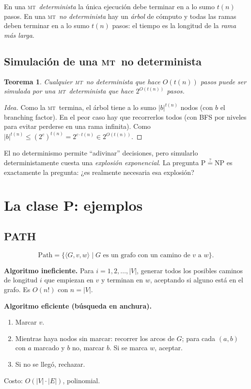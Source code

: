 \documentclass[11pt,a4paper]{article}
\theoremstyle{definicion}
\newtheorem{teorema}[definicion]{Teorema}
\newcommand{\MT}{\textsc{mt}}
\newcommand{\enc}[1]{\langle #1 \rangle}
\newcommand{\NP}{\mathrm{NP}}
\newcommand{\Pclass}{\mathrm{P}}
\begin{document}
En una \MT\ \emph{determinista} la \'unica ejecuci\'on debe terminar en a lo sumo $t(n)$ pasos. En una \MT\ \emph{no determinista} hay un \emph{\'arbol} de c\'omputo y todas las ramas deben terminar en a lo sumo $t(n)$ pasos: el tiempo es la longitud de la \emph{rama m\'as larga}.

\subsection{Simulaci\'on de una \MT\ no determinista}

\begin{teorema}
Cualquier \MT\ no determinista que hace $O(t(n))$ pasos puede ser simulada por una \MT\ determinista que hace $2^{O(t(n))}$ pasos.
\end{teorema}

\begin{proof}[Idea]
Como la \MT\ termina, el \'arbol tiene a lo sumo $|b|^{t(n)}$ nodos (con $b$ el branching factor). En el peor caso hay que recorrerlos todos (con BFS por niveles para evitar perderse en una rama infinita). Como $|b|^{t(n)} \leq (2^c)^{t(n)} = 2^{c \cdot t(n)} \in 2^{O(t(n))}$.
\end{proof}

\begin{idea}
El no determinismo permite ``adivinar'' decisiones, pero simularlo deterministamente cuesta una \emph{explosi\'on exponencial}. La pregunta $\Pclass \overset{?}{=} \NP$ es exactamente la pregunta: ¿es realmente necesaria esa explosi\'on?
\end{idea}

\section{La clase P: ejemplos}

\subsection{PATH}

\[
\mathrm{Path} = \{ \enc{G, v, w} \mid G \text{ es un grafo con un camino de } v \text{ a } w\}.
\]

\textbf{Algoritmo ineficiente.} Para $i = 1, 2, \dots, |V|$, generar todos los posibles caminos de longitud $i$ que empiezan en $v$ y terminan en $w$, aceptando si alguno est\'a en el grafo. Es $O(n!)$ con $n = |V|$.

\textbf{Algoritmo eficiente (b\'usqueda en anchura).}
\begin{enumerate}
    \item Marcar $v$.
    \item Mientras haya nodos sin marcar: recorrer los arcos de $G$; para cada $(a, b)$ con $a$ marcado y $b$ no, marcar $b$. Si se marca $w$, aceptar.
    \item Si no se lleg\'o, rechazar.
\end{enumerate}
Costo: $O(|V| \cdot |E|)$, polinomial.
\end{document}

